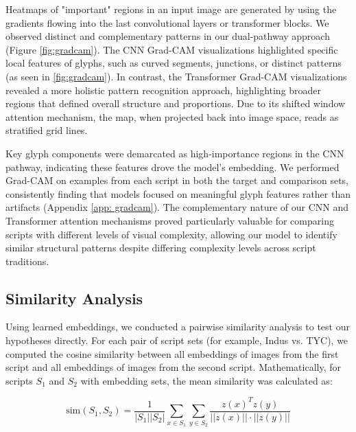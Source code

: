 \documentclass[11pt,a4paper,oneside]{report}
\begin{document}
Heatmaps of "important" regions in an input image are generated by using the gradients flowing into the last convolutional layers or transformer blocks. We observed distinct and complementary patterns in our dual-pathway approach (Figure \ref{fig:gradcam}). The CNN Grad-CAM visualizations highlighted specific local features of glyphs, such as curved segments, junctions, or distinct patterns (as seen in \ref{fig:gradcam}). In contrast, the Transformer Grad-CAM visualizations revealed a more holistic pattern recognition approach, highlighting broader regions that defined overall structure and proportions. Due to its shifted window attention mechanism, the map, when projected back into image space, reads as stratified grid lines. 

Key glyph components were demarcated as high-importance regions in the CNN pathway, indicating these features drove the model's embedding. We performed Grad-CAM on examples from each script in both the target and comparison sets, consistently finding that models focused on meaningful glyph features rather than artifacts (Appendix \ref{app: gradcam}). The complementary nature of our CNN and Transformer attention mechanisms proved particularly valuable for comparing scripts with different levels of visual complexity, allowing our model to identify similar structural patterns despite differing complexity levels across script traditions.

\subsection{Similarity Analysis}
\noindent\hspace{1cm}
Using learned embeddings, we conducted a pairwise similarity analysis to test our hypotheses directly. For each pair of script sets (for example, Indus vs. TYC), we computed the cosine similarity between all embeddings of images from the first script and all embeddings of images from the second script. Mathematically, for scripts $S_1$ and $S_2$ with embedding sets, the mean similarity was calculated as:

\begin{equation}
\text{sim}(S_1, S_2) = \frac{1}{|S_1||S_2|}\sum_{x \in S_1}\sum_{y \in S_2}\frac{z(x)^T z(y)}{||z(x)|| \cdot ||z(y)||}
\end{equation}
\end{document}
